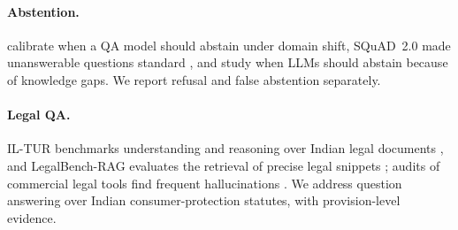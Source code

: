 \paragraph{Abstention.}
\citet{kamath2020selective} calibrate when a QA model should abstain under domain shift, SQuAD~2.0 made unanswerable questions standard \citep{rajpurkar2018squad2}, and \citet{feng2024abstain} study when LLMs should abstain because of knowledge gaps. We report refusal and false abstention separately.

\paragraph{Legal QA.}
IL-TUR benchmarks understanding and reasoning over Indian legal documents \citep{joshi2024iltur}, and LegalBench-RAG evaluates the retrieval of precise legal snippets \citep{pipitone2024legalbenchrag}; audits of commercial legal tools find frequent hallucinations \citep{magesh2024hallucination,dahl2024fictions}. We address question answering over Indian consumer-protection statutes, with provision-level evidence.
